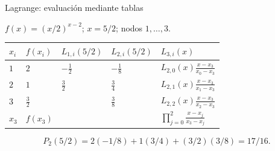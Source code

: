 \documentclass[main.tex]{subfiles}
\begin{document}
\begin{frame}[t]{Lagrange: evaluación mediante tablas}
\par\noindent\begin{minipage}[t][12mm][t]{\textwidth}\small\strut $f(x)=(x/2)^{x-2}$; $x=5/2$; nodos $1,\ldots,3$.\end{minipage}\par\nointerlineskip
\begin{minipage}[t]{\textwidth}\begingroup\scriptsize\setlength{\tabcolsep}{3pt}\begin{center}\begin{tabular}{|C{.065\textwidth}|C{.095\textwidth}|C{.19\textwidth}|C{.25\textwidth}|C{.25\textwidth}|}\hline
\rule[-2mm]{0pt}{6mm}$x_i$&$f(x_i)$&$L_{1,i}(5/2)$&$L_{2,i}(5/2)$&$L_{3,i}(x)$\\\hline
\rule[-2.5mm]{0pt}{9mm}$1$&$2$&$-\frac12$&$-\frac18$&$L_{2,0}(x)\frac{x-x_3}{x_0-x_3}$\\\hline
\rule[-2.5mm]{0pt}{9mm}$2$&$1$&$\frac32$&$\frac34$&$L_{2,1}(x)\frac{x-x_3}{x_1-x_3}$\\\hline
\rule[-2.5mm]{0pt}{9mm}$3$&$\frac{3}{2}$&&$\frac38$&$L_{2,2}(x)\frac{x-x_3}{x_2-x_3}$\\\hline
\rule[-2.5mm]{0pt}{9mm}$x_3$&$f(x_3)$&&&$\prod_{j=0}^2\frac{x-x_j}{x_3-x_j}$\\\hline
\end{tabular}\end{center}\endgroup\par
\end{minipage}\par\[P_2(5/2)=2(-1/8)+1(3/4)+(3/2)(3/8)=17/16.\]
\end{frame}
\end{document}
